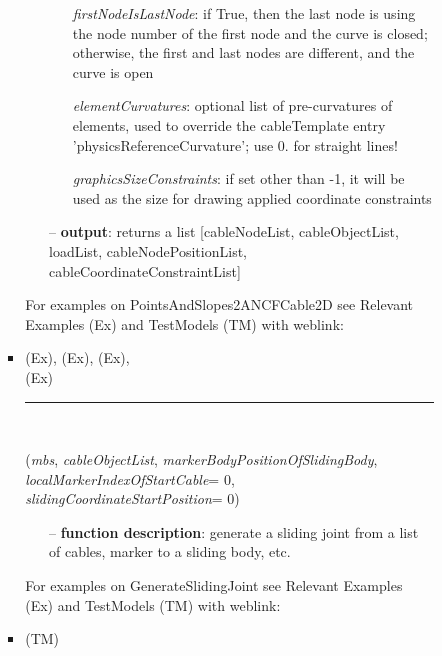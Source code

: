 \begin{itemize}[leftmargin=1.4cm]
\begin{itemize}[leftmargin=1.4cm]
\begin{itemize}[leftmargin=0.5cm]
\begin{itemize}[leftmargin=1.4cm]
\begin{itemize}[leftmargin=0.7cm]
\begin{itemize}[leftmargin=1.2cm]
\item[]{\it firstNodeIsLastNode}: if True, then the last node is using the node number of the first node and the curve is closed; otherwise, the first and last nodes are different, and the curve is open
\item[]{\it elementCurvatures}: optional list of pre-curvatures of elements, used to override the cableTemplate entry 'physicsReferenceCurvature'; use 0. for straight lines!
\item[]{\it graphicsSizeConstraints}: if set other than -1, it will be used as the size for drawing applied coordinate constraints
\end{itemize}
\item[--]
{\bf output}: returns a list [cableNodeList, cableObjectList, loadList, cableNodePositionList, cableCoordinateConstraintList]
\vspace{12pt}\end{itemize}
%
%
\noindent For examples on PointsAndSlopes2ANCFCable2D see Relevant Examples (Ex) and TestModels (TM) with weblink:
\bi
 \item \footnotesize {} (Ex), 
 (Ex), 
 (Ex), 
\\  (Ex)
\ei

%
\noindent\rule{8cm}{0.75pt}\vspace{1pt} \\ 
\begin{flushleft}
\label{sec:beams:GenerateSlidingJoint}
({\it mbs}, {\it cableObjectList}, {\it markerBodyPositionOfSlidingBody}, {\it localMarkerIndexOfStartCable}= 0, {\it slidingCoordinateStartPosition}= 0)
\end{flushleft}
\setlength{\itemindent}{0.7cm}
\begin{itemize}[leftmargin=0.7cm]
\item[--]
{\bf function description}: generate a sliding joint from a list of cables, marker to a sliding body, etc.
\vspace{12pt}\end{itemize}
%
%
\noindent For examples on GenerateSlidingJoint see Relevant Examples (Ex) and TestModels (TM) with weblink:
\bi
 \item \footnotesize {} (TM)
\ei


\end{itemize}
\end{itemize}
\end{itemize}
\end{itemize}
